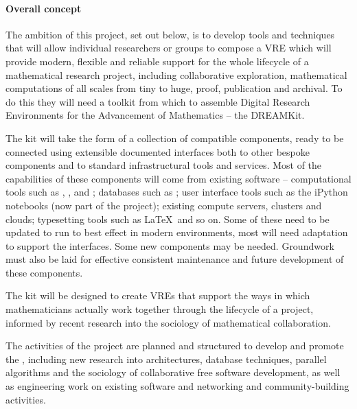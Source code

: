 




\paragraph{Overall concept}
The ambition of this project, set out below, is to develop tools and
techniques that will allow individual researchers or groups to compose
a VRE which will provide modern, flexible and reliable support for the
whole lifecycle of a mathematical research project, including
collaborative exploration, mathematical computations of all scales
from tiny to huge, proof, publication and archival. To do this they
will need a toolkit from
which to assemble Digital Research Environments for the
Advancement of Mathematics -- the DREAMKit.

The kit will take the form of a collection of compatible
components, ready to be connected using extensible documented
interfaces both to other bespoke components and to standard
infrastructural tools and services. Most of the capabilities of these
components will come from existing software -- computational tools
such as \Sage, \GAP, \Singular and \Pari; databases such as \LMFDB;
user interface tools such as the iPython notebooks (now part of the
\Jupyter project); existing compute
servers, clusters and clouds; typesetting tools such as \LaTeX\ and so
on. Some of these need to be updated to run to best effect in modern
environments, most will need adaptation to support the \TheProject
interfaces. Some new components may be needed. Groundwork must also be
laid for effective consistent maintenance and future development of
these components.

The kit will be designed to create VREs that support the ways in
which mathematicians actually work together through the lifecycle of a
project, informed by recent research into the sociology of
mathematical collaboration. 
 

The activities of the project are planned and structured to develop
and promote the \TheProject, including new research into
architectures, database techniques, parallel algorithms and the
sociology of collaborative free software development, as well as
engineering work on existing software and networking and
community-building activities.

